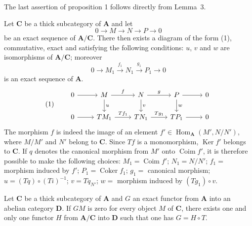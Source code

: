 The last assertion of
proposition 1 follows directly from
Lemma~3.

\begin{corollary}
Let $\mathbf C$ be a thick subcategory of $\mathbf A$ and let
\[
0 \to M \to N \to P \to 0
\]
be an exact sequence of $\mathbf A/\mathbf C$. There then exists a
diagram of the form (1), commutative, exact and satisfying the following
conditions: $u$, $v$ and $w$ are isomorphisms of $\mathbf A/\mathbf C$;
moreover
\[
0 \to M_1 \xrightarrow{f_1} N_1 \xrightarrow{g_1} P_1 \to 0
\]
is an exact sequence of $\mathbf A$.
\[
\text{(1)}\qquad
\begin{tikzcd}
0 \arrow[r] & M \arrow[r, "f"] \arrow[d, "u"] & N \arrow[r, "g"] \arrow[d, "v"] & P \arrow[r] \arrow[d, "w"] & 0 \\
0 \arrow[r] & TM_1 \arrow[r, "Tf_1"] & TN_1 \arrow[r, "Tg_1"] & TP_1 \arrow[r] & 0
\end{tikzcd}
\]
The morphism $f$ is indeed the image of an element
$f'\in\operatorname{Hom}_{\mathbf A}(M',N/N')$, where $M/M'$ and $N'$
belong to $\mathbf C$. Since $Tf$ is a monomorphism, $\operatorname{Ker}f'$
belongs to $\mathbf C$. If $q$ denotes the canonical morphism from
$M'$ onto $\operatorname{Coim}f'$, it is therefore possible to make the
following choices: $M_1=\operatorname{Coim}f'$; $N_1=N/N'$;
$f_1=$ morphism induced by $f'$; $P_1=\operatorname{Coker}f_1$;
$g_1=$ canonical morphism; $u=(Tq)\circ(Ti)^{-1}$; $v=Tq_{N'}$;
$w=$ morphism induced by $(Tg_1)\circ v$.
\end{corollary}

\begin{corollary}
Let $\mathbf C$ be a thick subcategory of $\mathbf A$ and $G$ an
exact functor from $\mathbf A$ into an abelian category $\mathbf D$. If
$GM$ is zero for every object $M$ of $\mathbf C$, there exists one and
only one functor $H$ from $\mathbf A/\mathbf C$ into $\mathbf D$ such
that one has $G=H\circ T$.
\end{corollary}

